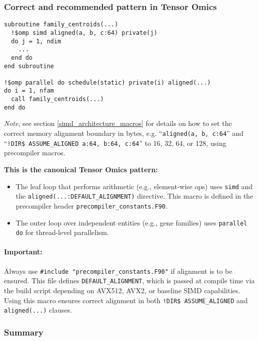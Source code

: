 \documentclass{article}
\begin{document}
\subsubsection{Correct and recommended pattern in Tensor Omics}

\begin{verbatim}
subroutine family_centroids(...)
  !$omp simd aligned(a, b, c:64) private(j)
  do j = 1, ndim
    ...
  end do
end subroutine

!$omp parallel do schedule(static) private(i) aligned(...)
do i = 1, nfam
  call family_centroids(...)
end do
\end{verbatim}

\emph{Note}, see section \ref{simd_architecture_macros} for details on how to
set the correct memory alignment boundary in bytes, e.g. ``\texttt{aligned(a,
b, c:64}'' and ``\texttt{!DIR\$ ASSUME\_ALIGNED a:64, b:64, c:64}'' to 16, 32,
64, or 128, using precompiler macros.

\textbf{This is the canonical Tensor Omics pattern:}
\begin{itemize}
\item The leaf loop that performs arithmetic (e.g., element-wise ops) uses \texttt{simd} and the \texttt{aligned(...:DEFAULT\_ALIGNMENT)} directive. This macro is defined in the precompiler header \texttt{precompiler\_constants.F90}.
\item The outer loop over independent entities (e.g., gene families) uses \texttt{parallel do} for thread-level parallelism.
\end{itemize}

\paragraph{Important:} Always use \texttt{\#include "precompiler\_constants.F90"} if alignment is to be ensured. This file defines \texttt{DEFAULT\_ALIGNMENT}, which is passed at compile time via the build script depending on AVX512, AVX2, or baseline SIMD capabilities. Using this macro ensures correct alignment in both \texttt{!DIR\$ ASSUME\_ALIGNED} and \texttt{aligned(...)} clauses.

\subsubsection{Summary}
\end{document}
